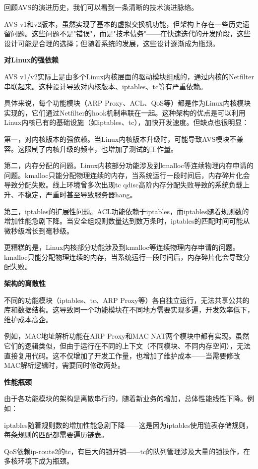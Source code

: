 回顾AVS的演进历史，我们可以看到一条清晰的技术演进脉络。

AVS v1和v2版本，虽然实现了基本的虚拟交换机功能，但架构上存在一些历史遗留问题。这些问题不是"错误"，而是"技术债务"——在快速迭代的开发阶段，这些设计可能是合理的选择；但随着系统的发展，这些设计逐渐成为瓶颈。

\textbf{对Linux的强依赖}

AVS v1/v2实际上是由多个Linux内核层面的驱动模块组成的，通过内核的Netfilter串联起来。这种设计导致对内核版本、iptables、tc等有严重依赖。

具体来说，每个功能模块（ARP Proxy、ACL、QoS等）都是作为Linux内核模块实现的，它们通过Netfilter的hook机制串联在一起。这种架构的优点是可以利用Linux内核已有的基础设施（如iptables、tc），加快开发速度。但缺点也很明显：

第一，对内核版本的强依赖。当Linux内核版本升级时，可能导致AVS模块不兼容。这限制了内核升级的频率，也增加了测试的工作量。

第二，内存分配的问题。Linux内核部分功能涉及到kmalloc等连续物理内存申请的问题。kmalloc只能分配物理连续的内存，当系统运行一段时间后，内存碎片化会导致分配失败。线上环境曾多次出现tc qdisc高阶内存分配失败导致的系统负载上升、不稳定，严重时甚至导致服务器hang。

第三，iptables的扩展性问题。ACL功能依赖于iptables，而iptables随着规则数的增加性能急剧下降。当安全组规则数量达到数万条时，iptables的匹配时间可能从微秒级增长到毫秒级。

更糟糕的是，Linux内核部分功能涉及到kmalloc等连续物理内存申请的问题。kmalloc只能分配物理连续的内存，当系统运行一段时间后，内存碎片化会导致分配失败。

\textbf{架构的离散性}

不同的功能模块（iptables、tc、ARP Proxy等）各自独立运行，无法共享公共的库和数据结构。这导致同一个功能模块在不同地方需要实现多遍，开发效率低下，维护成本高企。

例如，MAC地址解析功能在ARP Proxy和MAC NAT两个模块中都有实现。虽然它们的逻辑类似，但由于运行在不同的上下文（不同模块、不同内存空间），无法直接复用代码。这不仅增加了开发工作量，也增加了维护成本——当需要修改MAC解析逻辑时，需要同时修改两处。

\textbf{性能瓶颈}

由于各功能模块的架构是离散串行的，随着新业务的增加，总体性能线性下降。例如：

iptables随着规则数的增加性能急剧下降——这是因为iptables使用链表存储规则，每条规则的匹配都需要遍历链表。

QoS依赖ip-route2的tc，有巨大的锁开销——tc的队列管理涉及大量的锁操作，在多核环境下成为瓶颈。

